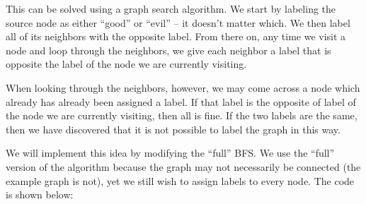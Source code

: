 \begin{progprob}
    \begin{soln}
        This can be solved using a graph search algorithm. We start by
        labeling the source node as either ``good'' or ``evil'' -- it doesn't
        matter which. We then label all of its neighbors with the opposite
        label. From there on, any time we visit a node and loop through the
        neighbors, we give each neighbor a label that is opposite the label
        of the node we are currently visiting.

        When looking through the neighbors, however, we may come across a
        node which already has already been assigned a label. If that label
        is the opposite of label of the node we are currently visiting, then
        all is fine. If the two labels are the same, then we have discovered
        that it is not possible to label the graph in this way.

        We will implement this idea by modifying the ``full'' BFS. We use
        the ``full'' version of the algorithm because the graph may not necessarily
        be connected (the example graph is not), yet we still wish to assign
        labels to every node. The code is shown below:

        \inputminted{python}{\thisdir/include-solution/assign_good_and_evil.py}

    \end{soln}
\end{progprob}
